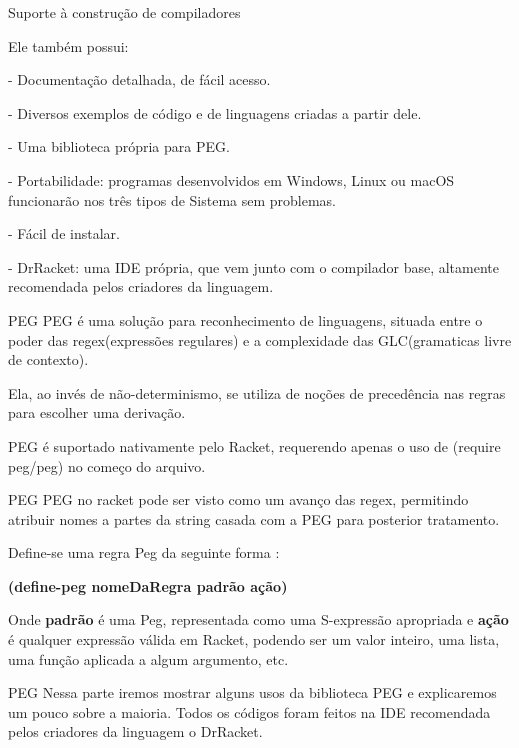 \documentclass{beamer}
\begin{document}

\begin{frame}[fragile]{Suporte à construção de compiladores}

Ele também possui:
 
- Documentação detalhada, de fácil acesso.

- Diversos exemplos de código e de linguagens criadas a partir dele.

- Uma biblioteca própria para PEG.

- Portabilidade: programas desenvolvidos em Windows, Linux ou macOS funcionarão nos três tipos de Sistema sem problemas.

- Fácil de instalar.

- DrRacket: uma IDE própria, que vem junto com o compilador base, altamente recomendada pelos criadores da linguagem.


\end{frame}



\begin{frame}{PEG}
PEG é uma solução para reconhecimento de linguagens, situada entre o poder das regex(expressões regulares) e a complexidade das GLC(gramaticas livre de 
contexto). 

Ela, ao invés de não-determinismo, se utiliza de noções de precedência nas regras para escolher uma derivação.

PEG é suportado nativamente pelo Racket, requerendo apenas o uso de (require peg/peg) no começo do arquivo.

\end{frame}


\begin{frame}{PEG}
PEG no racket pode ser visto como um avanço das regex, permitindo atribuir nomes a partes da string casada com a PEG para posterior tratamento.

Define-se uma regra Peg da seguinte forma :

\textbf{(define-peg nomeDaRegra padrão ação)}

Onde  \textbf{padrão} é uma Peg, representada como uma S-expressão apropriada e  \textbf{ação} é qualquer expressão válida em Racket, podendo ser um valor inteiro, uma lista, uma função aplicada a algum argumento, etc.

\end{frame}


\begin{frame}{PEG}
Nessa parte iremos mostrar alguns usos da biblioteca PEG e explicaremos um pouco sobre a maioria.
Todos os códigos foram feitos na IDE recomendada pelos criadores da linguagem o DrRacket.
\end{frame}
\end{document}
